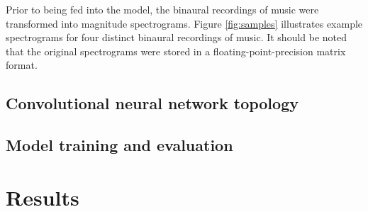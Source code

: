 \documentclass{article}
\begin{document}
Prior to being fed into the model, the binaural recordings of music were transformed into magnitude spectrograms. Figure \ref{fig:samples} illustrates example spectrograms for four distinct binaural recordings of music. It should be noted that the original spectrograms were stored in a floating-point-precision matrix format.

\subsection{Convolutional neural network topology}
\subsection{Model training and evaluation}

\section{Results}
\label{sec:results}
\end{document}
